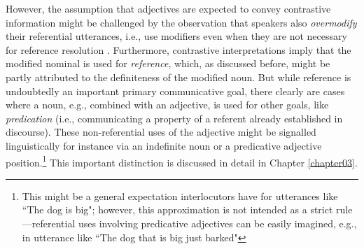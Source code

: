 However, the assumption that adjectives are expected to convey contrastive information might be challenged by the observation that speakers also \textit{overmodify} their referential utterances, i.e., use modifiers even when they are not necessary for reference resolution \parencite{degen2020redundancy}.  Furthermore, contrastive interpretations imply that the modified nominal is used for \textit{reference}, which, as discussed before, might be partly attributed to the definiteness of the modified noun. But while reference is undoubtedly an important primary communicative goal, there clearly are cases where a noun, e.g., combined with an adjective, is used for other goals, like \textit{predication} (i.e., communicating a property of a referent already established in discourse). These non-referential uses of the adjective might be signalled linguistically for instance via an indefinite noun or a predicative adjective position.\footnote{This might be a general expectation interlocutors have for utterances like ``The dog is big"; however, this approximation is not intended as a strict rule---referential uses involving predicative adjectives can be easily imagined, e.g., in utterance like ``The dog that is big just barked"}   %
This important distinction is discussed in detail in Chapter \ref{chapter03}.  

